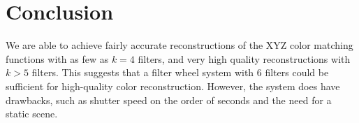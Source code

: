 \section{Conclusion}
We are able to achieve fairly accurate reconstructions of the XYZ color matching functions with as few as $k=4$ filters, and very high quality reconstructions with $k>5$ filters.
This suggests that a filter wheel system with 6 filters could be sufficient for high-quality color reconstruction. 
However, the system does have drawbacks, such as shutter speed on the order of seconds and the need for a static scene. 


